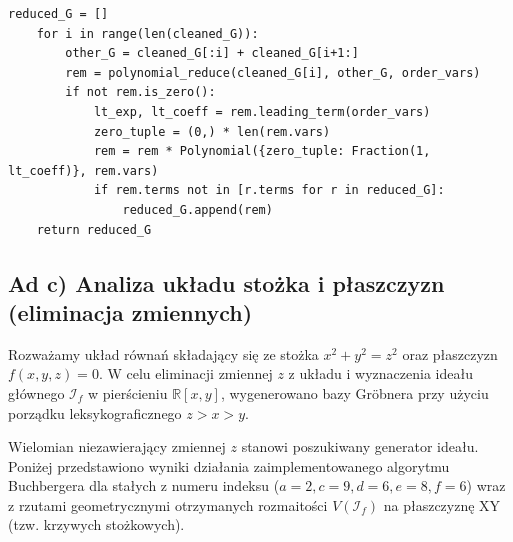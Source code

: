 \documentclass[12pt,a4paper]{article}
\begin{document}
\begin{lstlisting}[caption={Kody źródłowe funkcji algorytmu Buchbergera}]
    reduced_G = []
    for i in range(len(cleaned_G)):
        other_G = cleaned_G[:i] + cleaned_G[i+1:]
        rem = polynomial_reduce(cleaned_G[i], other_G, order_vars)
        if not rem.is_zero():
            lt_exp, lt_coeff = rem.leading_term(order_vars)
            zero_tuple = (0,) * len(rem.vars)
            rem = rem * Polynomial({zero_tuple: Fraction(1, lt_coeff)}, rem.vars)
            if rem.terms not in [r.terms for r in reduced_G]:
                reduced_G.append(rem)
    return reduced_G
\end{lstlisting}





\subsection{Ad c) Analiza układu stożka i płaszczyzn (eliminacja zmiennych)}

Rozważamy układ równań składający się ze stożka $x^2 + y^2 = z^2$ oraz płaszczyzn $f(x,y,z) = 0$. W celu eliminacji zmiennej $z$ z układu i wyznaczenia ideału głównego $\mathcal{I}_f$ w pierścieniu $\mathbb{R}[x,y]$, wygenerowano bazy Gröbnera przy użyciu porządku leksykograficznego $z > x > y$. 

Wielomian niezawierający zmiennej $z$ stanowi poszukiwany generator ideału. Poniżej przedstawiono wyniki działania zaimplementowanego algorytmu Buchbergera dla stałych z numeru indeksu ($a=2, c=9, d=6, e=8, f=6$) wraz z rzutami geometrycznymi otrzymanych rozmaitości $V(\mathcal{I}_f)$ na płaszczyznę XY (tzw. krzywych stożkowych).
\end{document}
